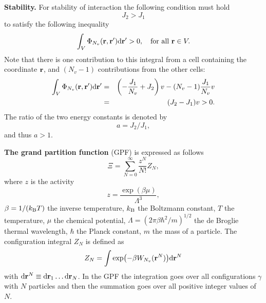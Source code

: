 \documentclass[12pt]{article}
\numberwithin{equation}{section}
\begin{document}
	\textbf{Stability.} For stability of interaction the following condition must hold
	\begin{equation*}
		J_2 > J_1
	\end{equation*}
	to satisfy the following inequality~\cite{KKD20,Ruelle70}
	\begin{equation}
		\int_{V} \Phi_{N_v}(\vb{r},\vb{r}') {\rm d} \vb{r}' > 0, \quad \text{for all } \vb{r} \in V.
	\end{equation}
	Note that there is one contribution to this integral from a cell containing the coordinate $\vb{r}$, and $(N_v - 1)$ contributions from the other cells:
	\begin{eqnarray*}
		\int_{V} \Phi_{N_v}(\vb{r},\vb{r}') {\rm d} \vb{r}' & = & \left(-\frac{J_1}{N_v} + J_2\right)v - (N_v - 1) \frac{J_1}{N_v}v
		\\
		& = & (J_2 - J_1)v > 0.
	\end{eqnarray*}
	The ratio of the two energy constants is denoted by
	$$a = J_2/J_1,$$
	and thus $a > 1.$
	
	\textbf{The grand partition function} (GPF) is expressed as follows~\cite[see eqs.~(2.4.6) and~(2.3.13)]{HansenMcDonald13}
	\begin{equation}\label{ZGR}
		\Xi=\sum_{N=0}^{\infty}\frac{z^N}{N!}Z_N,
	\end{equation}
		where $z$ is the activity
	\begin{equation*}
		z = \frac{\exp(\beta \mu)}{\Lambda^3},
	\end{equation*}
	$\beta = 1/(k_{\rm B} T)$ the inverse temperature, $k_{\rm B}$ the Boltzmann constant, $T$ the temperature, $\mu$ the chemical potential, $\Lambda = (2\pi\beta\hbar^2/m)^{1/2}$ the de Broglie thermal wavelength, $\hbar$ the Planck constant, $m$ the mass of a particle. The configuration integral $Z_N$ is defined as
	\begin{equation}
		Z_N = \int\exp(-\beta W_{N_v}(\vb{r}^N)){\rm d}\vb{r}^N
	\end{equation}
	with ${\rm d} \vb{r}^N \equiv {\rm d}{\vb r_1} \dotsc {\rm d}{\vb r_N}$.
	In the GPF the integration goes over all configurations $\gamma$ with $N$ particles and then the summation goes over all positive integer values of $N$.
	
\end{document}

